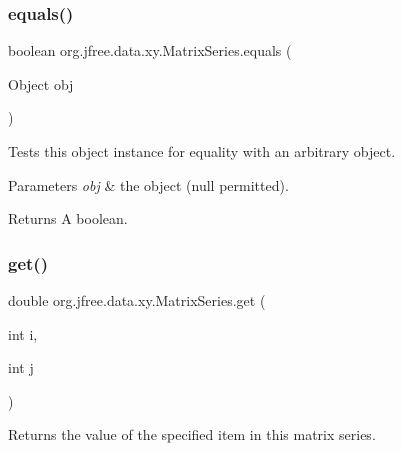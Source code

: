 \subsubsection{\texorpdfstring{equals()}{equals()}}
{\footnotesize\ttfamily boolean org.\+jfree.\+data.\+xy.\+Matrix\+Series.\+equals (\begin{DoxyParamCaption}\item[{Object}]{obj }\end{DoxyParamCaption})}

Tests this object instance for equality with an arbitrary object.


\begin{DoxyParams}{Parameters}
{\em obj} & the object ({\ttfamily null} permitted).\\
\hline
\end{DoxyParams}
\begin{DoxyReturn}{Returns}
A boolean. 
\end{DoxyReturn}
\mbox{\label{classorg_1_1jfree_1_1data_1_1xy_1_1_matrix_series_a673ce1dc727458893120d67ed4e7a35c}} 
\subsubsection{\texorpdfstring{get()}{get()}}
{\footnotesize\ttfamily double org.\+jfree.\+data.\+xy.\+Matrix\+Series.\+get (\begin{DoxyParamCaption}\item[{int}]{i,  }\item[{int}]{j }\end{DoxyParamCaption})}

Returns the value of the specified item in this matrix series.


